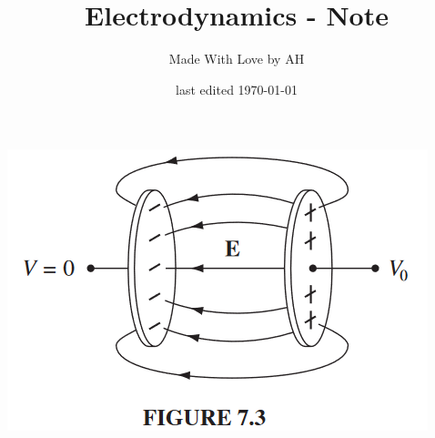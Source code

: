 \documentclass{article}
\title{Electrodynamics - Note}
\author{Made With Love by AH}
\date{last edited \today}
\begin{document}

\makeatletter
    \begin{titlepage}
        \begin{center}
            \includegraphics[width=0.7\linewidth]{logo.png}\\[4ex]
            {\huge \bfseries  \@title }\\[2ex] 
            {\LARGE  \@author}\\[50ex] 
            {\large \@date}
        \end{center}
    \end{titlepage}
\makeatother

\maketitle
\tableofcontents
\pagebreak


\end{document}
